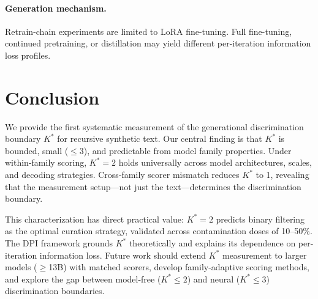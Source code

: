 \documentclass[11pt,a4paper]{article}
\newcommand{\kstar}{K^{*}}
\begin{document}
\paragraph{Generation mechanism.}
Retrain-chain experiments are limited to LoRA fine-tuning.
Full fine-tuning, continued pretraining, or distillation may yield different per-iteration information loss profiles.

\section{Conclusion}
\label{sec:conclusion}

We provide the first systematic measurement of the generational discrimination boundary $\kstar$ for recursive synthetic text.
Our central finding is that $\kstar$ is bounded, small ($\leq 3$), and predictable from model family properties.
Under within-family scoring, $\kstar = 2$ holds universally across model architectures, scales, and decoding strategies.
Cross-family scorer mismatch reduces $\kstar$ to 1, revealing that the measurement setup---not just the text---determines the discrimination boundary.

This characterization has direct practical value: $\kstar = 2$ predicts binary filtering as the optimal curation strategy, validated across contamination doses of 10--50\%.
The DPI framework grounds $\kstar$ theoretically and explains its dependence on per-iteration information loss.
Future work should extend $\kstar$ measurement to larger models ($\geq$13B) with matched scorers, develop family-adaptive scoring methods, and explore the gap between model-free ($\kstar \leq 2$) and neural ($\kstar \leq 3$) discrimination boundaries.
\end{document}
